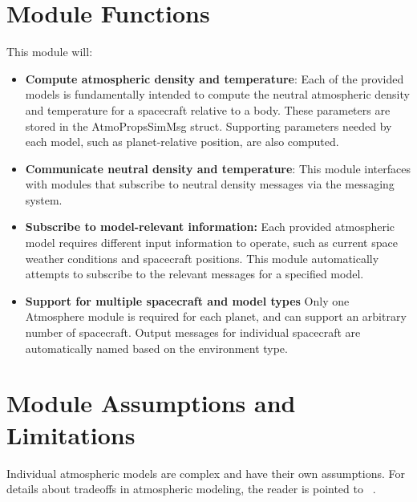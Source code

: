 

\section{Module Functions}
This module will:
\begin{itemize}
	\item \textbf{Compute atmospheric density and temperature}: Each of the provided models is fundamentally intended to compute the neutral atmospheric density and temperature for a spacecraft relative to a body. These parameters are stored in the AtmoPropsSimMsg struct. Supporting parameters needed by each model, such as planet-relative position, are also computed.
	\item \textbf{Communicate neutral density and temperature}: This module interfaces with modules that subscribe to neutral density messages via the messaging system.
	\item \textbf {Subscribe to model-relevant information:} Each provided atmospheric model requires different input information to operate, such as current space weather conditions and spacecraft positions. This module automatically attempts to subscribe to the relevant messages for a specified model. 
	\item \textbf{Support for multiple spacecraft and model types} Only one Atmosphere module is required for each planet, and can support an arbitrary number of spacecraft. Output messages for individual spacecraft are automatically named based on the environment type.
\end{itemize}

\section{Module Assumptions and Limitations}
Individual atmospheric models are complex and have their own assumptions. For details about tradeoffs in atmospheric modeling, the reader is pointed to ~. 